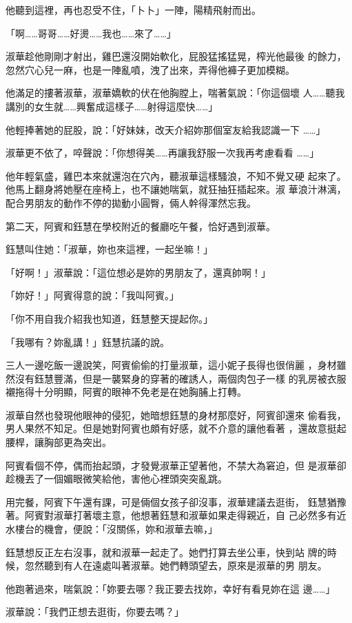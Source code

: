 他聽到這裡，再也忍受不住，「卜卜」一陣，陽精飛射而出。

「啊……哥哥……好燙……我也……來了……」

淑華趁他剛剛才射出，雞巴還沒開始軟化，屁股猛搖猛晃，榨光他最後
的餘力，忽然穴心兒一麻，也是一陣亂噴，洩了出來，弄得他褲子更加模糊。

他滿足的摟著淑華，淑華嬌軟的伏在他胸膛上，喘著氣說：「你這個壞
人……聽我講別的女生就……興奮成這樣子……射得這麼快……」

他輕捧著她的屁股，說：「好妹妹，改天介紹妳那個室友給我認識一下
……」

淑華更不依了，啐聲說：「你想得美……再讓我舒服一次我再考慮看看
……」

他年輕氣盛，雞巴本來就還泡在穴內，聽淑華這樣騷浪，不知不覺又硬
起來了。他馬上翻身將她壓在座椅上，也不讓她喘氣，就狂抽狂插起來。淑
華浪汁淋漓，配合男朋友的動作不停的拋動小圓臀，倆人幹得渾然忘我。

第二天，阿賓和鈺慧在學校附近的餐廳吃午餐，恰好遇到淑華。

鈺慧叫住她：「淑華，妳也來這裡，一起坐嘛！」

「好啊！」淑華說：「這位想必是妳的男朋友了，還真帥啊！」

「妳好！」阿賓得意的說：「我叫阿賓。」

「你不用自我介紹我也知道，鈺慧整天提起你。」

「我哪有？妳亂講！」鈺慧抗議的說。

三人一邊吃飯一邊說笑，阿賓偷偷的打量淑華，這小妮子長得也很俏麗
，身材雖然沒有鈺慧豐滿，但是一襲緊身的穿著的確誘人，兩個肉包子一樣
的乳房被衣服襯拖得十分明顯，阿賓的眼神不免老是在她胸脯上打轉。

淑華自然也發現他眼神的侵犯，她暗想鈺慧的身材那麼好，阿賓卻還來
偷看我，男人果然不知足。但是她對阿賓也頗有好感，就不介意的讓他看著
，還故意挺起腰桿，讓胸部更為突出。

阿賓看個不停，偶而抬起頭，才發覺淑華正望著他，不禁大為窘迫，但
是淑華卻趁機丟了一個媚眼微笑給他，害他心裡頭突突亂跳。

用完餐，阿賓下午還有課，可是倆個女孩子卻沒事，淑華建議去逛街，
鈺慧猶豫著。阿賓對淑華打著壞主意，他想著鈺慧和淑華如果走得親近，自
己必然多有近水樓台的機會，便說：「沒關係，妳和淑華去嘛，」

鈺慧想反正左右沒事，就和淑華一起走了。她們打算去坐公車，快到站
牌的時候，忽然聽到有人在遠處叫著淑華。她們轉頭望去，原來是淑華的男
朋友。

他跑著過來，喘氣說：「妳要去哪？我正要去找妳，幸好有看見妳在這
邊……」

淑華說：「我們正想去逛街，你要去嗎？」

